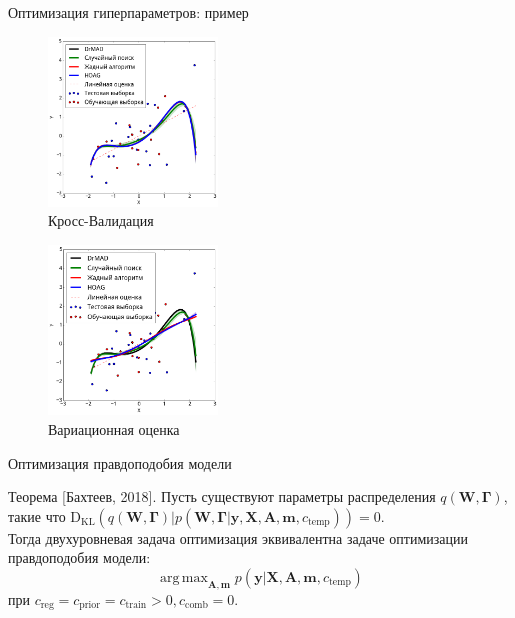 \documentclass[usenames,dvipsnames,11pt,pdf,utf8,russian,aspectratio=169]{beamer}
\DeclareMathOperator*{\argmax}{arg\,max}
\begin{document}
\begin{frame}{Оптимизация гиперпараметров: пример}
\begin{multicols}{2}
\begin{figure}[h]
\includegraphics[width=0.4\textwidth]{./slide_plots/poly_cv.png}
\caption*{Кросс-Валидация}
\end{figure}

\begin{figure}[h]
\includegraphics[width=0.4\textwidth]{./slide_plots/poly_var.png}
\caption*{Вариационная оценка}
\end{figure}
\end{multicols}

\end{frame}

\begin{frame}{Оптимизация правдоподобия модели}
\begin{block}{Теорема  [Бахтеев, 2018].}
Пусть существуют параметры распределения $q(\mathbf{W}, \boldsymbol{\Gamma})$, такие что $\text{D}_\text{KL}(q(\mathbf{W}, \boldsymbol{\Gamma})|p(\mathbf{W},  \boldsymbol{\Gamma}| \mathbf{y}, \mathbf{X}, \mathbf{A}, \mathbf{m}, c_\text{temp})) = 0$.\\
Тогда двухуровневая задача оптимизация эквивалентна задаче оптимизации правдоподобия модели:
$$\argmax_{\mathbf{A}, \mathbf{m}}  p(\mathbf{y}|\mathbf{X},\mathbf{A},\mathbf{m}, c_{\text{temp}})$$ 
при $c_{\text{reg}} = c_{\text{prior}} = c_{\text{train}} >0, c_{\text{comb}} = 0$. 
\end{block}
~\\

\end{frame}
\end{document}
